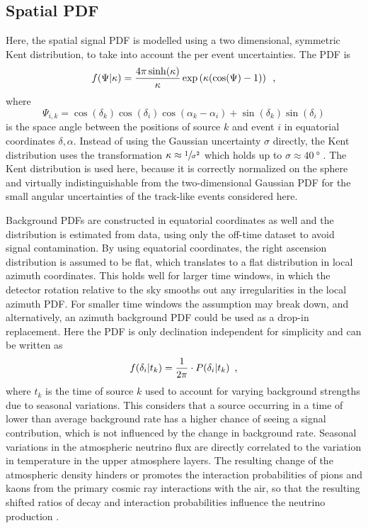 \subsection*{Spatial PDF}
Here, the spatial signal PDF is modelled using a two dimensional, symmetric Kent distribution, to take into account the per event uncertainties.
The PDF is
\begin{equation}
  f(\Psi|\kappa)
  = \frac{4\pi \sinh(\kappa)}{\kappa}\exp\left(\kappa(\cos(\Psi)-1)\right)
  \enspace\text{,}
\end{equation}
where
\begin{equation}
  \Psi_{i,k}
  = \cos(\delta_k)\cos(\delta_i)\cos(\alpha_k - \alpha_i) +
    \sin(\delta_k)\sin(\delta_i)
\end{equation}
is the space angle between the positions of source $k$ and event $i$ in equatorial coordinates $\delta, \alpha$.
Instead of using the Gaussian uncertainty $\sigma$ directly, the Kent distribution uses the transformation $\kappa \approx \sfrac{1}{\sigma^2}$ which holds up to $\sigma \approx \SI{40}{\degree}$ \cite{Yasutomi:2014kent,Jakob:2012kent}.
The Kent distribution is used here, because it is correctly normalized on the sphere and virtually indistinguishable from the two-dimensional Gaussian PDF for the small angular uncertainties of the track-like events considered here.

Background PDFs are constructed in equatorial coordinates as well and the distribution is estimated from data, using only the off-time dataset to avoid signal contamination.
By using equatorial coordinates, the right ascension distribution is assumed to be flat, which translates to a flat distribution in local azimuth coordinates.
This holds well for larger time windows, in which the detector rotation relative to the sky smooths out any irregularities in the local azimuth PDF.
For smaller time windows the assumption may break down, and alternatively, an azimuth background PDF could be used as a drop-in replacement.
Here the PDF is only declination independent for simplicity and can be written as
\begin{equation}
  f(\delta_i|t_k) = \frac{1}{2\pi}\cdot P(\delta_i|t_k)
  \enspace\text{,}
\end{equation}
where $t_k$ is the time of source $k$ used to account for varying background strengths due to seasonal variations.
This considers that a source occurring in a time of lower than average background rate has a higher chance of seeing a signal contribution, which is not influenced by the change in background rate.
Seasonal variations in the atmospheric neutrino flux are directly correlated to the variation in temperature in the upper atmosphere layers.
The resulting change of the atmospheric density hinders or promotes the interaction probabilities of pions and kaons from the primary cosmic ray interactions with the air, so that the resulting shifted ratios of decay and interaction probabilities influence the neutrino production \cite{Barret:1952seasons,Gaisser:2010seasons,Gaisser:2013icrc,GRASHORN2010140}.

